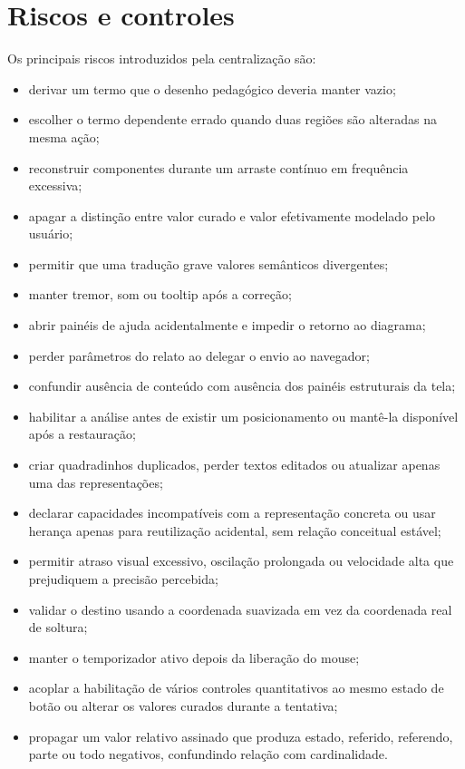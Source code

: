 \documentclass[12pt,a4paper]{article}
\begin{document}
\section{Riscos e controles}

Os principais riscos introduzidos pela centralização são:
\begin{itemize}[noitemsep]
  \item derivar um termo que o desenho pedagógico deveria manter vazio;
  \item escolher o termo dependente errado quando duas regiões são alteradas na mesma ação;
  \item reconstruir componentes durante um arraste contínuo em frequência excessiva;
  \item apagar a distinção entre valor curado e valor efetivamente modelado pelo usuário;
  \item permitir que uma tradução grave valores semânticos divergentes;
  \item manter tremor, som ou tooltip após a correção;
  \item abrir painéis de ajuda acidentalmente e impedir o retorno ao diagrama;
  \item perder parâmetros do relato ao delegar o envio ao navegador;
  \item confundir ausência de conteúdo com ausência dos painéis estruturais da tela;
  \item habilitar a análise antes de existir um posicionamento ou mantê-la disponível após a restauração;
  \item criar quadradinhos duplicados, perder textos editados ou atualizar apenas uma das representações;
  \item declarar capacidades incompatíveis com a representação concreta ou usar herança apenas para reutilização acidental, sem relação conceitual estável;
  \item permitir atraso visual excessivo, oscilação prolongada ou velocidade alta que prejudiquem a precisão percebida;
  \item validar o destino usando a coordenada suavizada em vez da coordenada real de soltura;
  \item manter o temporizador ativo depois da liberação do mouse;
  \item acoplar a habilitação de vários controles quantitativos ao mesmo estado de botão ou alterar os valores curados durante a tentativa;
  \item propagar um valor relativo assinado que produza estado, referido, referendo, parte ou todo negativos, confundindo relação com cardinalidade.
\end{itemize}
\end{document}
